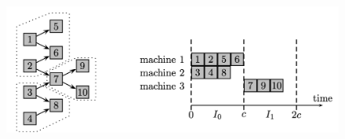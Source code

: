 \begin{figure}
\begin{center}
    \includegraphics[width=15cm]{chapters/scheduling1/scheduling_intervals.png}

\end{center}
\end{figure}
